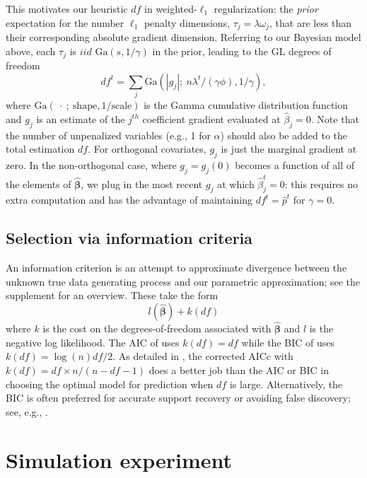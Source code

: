 \documentclass[12pt]{article}
\newcommand{\bs}[1]{\boldsymbol{#1}}
\newcommand{\mr}[1]{\mathrm{#1}}
\begin{document}
This motivates our heuristic $df$ in weighted-$\ell_1$ regularization:  the {\it prior} expectation for the number  $\ell_1$ penalty dimensions, $\tau_j = \lambda \omega_j$, that are less than their corresponding absolute gradient dimension.  Referring to our Bayesian model above, each $\tau_j$ is $iid$ $\mr{Ga}(s,1/\gamma)$ in the prior,
leading to the GL degrees of freedom
\begin{equation}
\label{edf} df^t = \sum_j \mr{Ga}(|g_{j}|;~n\lambda^t/(\gamma\phi),
1/\gamma), \end{equation} where $\mr{Ga}(~\cdot~;~\mr{shape}, 1/\mr{scale})$
is the Gamma cumulative distribution function and $g_j$ is an estimate of  the
$j^{th}$ coefficient gradient evaluated at $\hat\beta_j=0$. Note that
the number of unpenalized variables (e.g., 1 for $\alpha$) should also be
added to the total  estimation $df$.  For  orthogonal covariates,  $g_j$ is
just the marginal gradient at zero. In the non-orthogonal case, where $g_{j} =
g_j(0)$ becomes a function of all of the elements of $\bs{\hat\beta}$, we plug
in the most recent $g_j$ at which $\hat\beta^t_j=0$:  this requires no extra
computation and has the advantage of maintaining $df^t =
\hat p^t$ for $\gamma = 0$.

\subsection{Selection via information criteria}

An information criterion is an attempt to approximate
 divergence between the unknown true data generating
process and our parametric approximation; see the supplement for an
overview.  These  take the form
\begin{equation}
l(\bs{\hat\beta}) + k(df)
\end{equation}
where $k$ is the cost on the degrees-of-freedom associated with
 $\bs{\hat\beta}$ and $l$ is the negative log likelihood.  The AIC of
\cite{akaike_information_1973} uses $k(df) = df$ while the BIC of \cite{schwarz_estimating_1978}
uses $k(df) = \log(n)df/2$. As detailed in \cite{flynn_efficiency_2013}, the
corrected AICc with $k(df) = df\times n/(n-df-1)$ does a better job than the
AIC or BIC in choosing the optimal model for prediction when $df$ is large.
Alternatively, the BIC is often preferred for accurate support recovery or
avoiding false discovery; see, e.g.,
\cite{zou_degrees_2007}.


\section{Simulation experiment}
\label{sec:sim}
\end{document}
